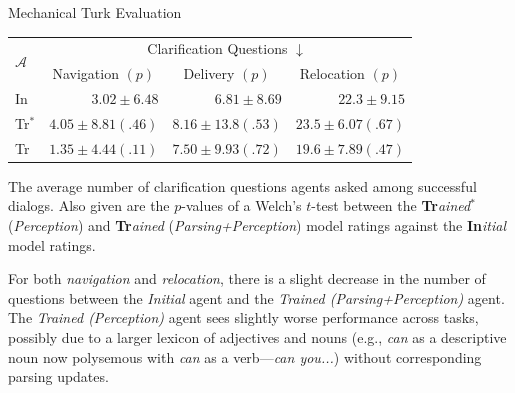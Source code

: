 \documentclass[final]{beamer}
\newcommand{\setblocksize}{\Large \centering}
\newcommand{\paragraphbreak}{\vspace{1cm}}
\begin{document}
\begin{frame}{}
\begin{columns}[t]
\begin{column}{0.24\linewidth}
\begin{block}{\setblocksize Mechanical Turk Evaluation}
{\begin{table}[t]
    \centering
    \begin{tabular}{l r r r}
        \multirow{2}{*}{$\mathcal{A}$} & \multicolumn{3}{c}{Clarification Questions $\downarrow$} \\
        & \multicolumn{1}{c}{Navigation $(p)$} & \multicolumn{1}{c}{Delivery $(p)$} & \multicolumn{1}{c}{Relocation $(p)$} \\
        \toprule
        In & $3.02\pm6.48$\phantom{$(.00)$} & $6.81\pm8.69$\phantom{$(.00)$} & $22.3\pm9.15$\phantom{$(.00)$} \\
        Tr$^*$ & $4.05\pm8.81 (.46)$ & $8.16\pm13.8 (.53)$ & $23.5\pm6.07 (.67)$ \\
        Tr & $1.35\pm4.44 (.11)$ & $7.50\pm9.93 (.72)$ & $19.6\pm7.89 (.47)$ \\
        \bottomrule
    \end{tabular}
\end{table}
The average number of clarification questions agents asked among successful dialogs.
Also given are the $p$-values of a Welch's $t$-test between the \textbf{Tr}\emph{ained}$^*$ (\emph{Perception}) and \textbf{Tr}\emph{ained} (\emph{Parsing+Perception}) model ratings against the \textbf{In}\emph{itial} model ratings.
\paragraphbreak

For both \emph{navigation} and \emph{relocation}, there is a slight decrease in the number of questions between the \emph{Initial} agent and the \emph{Trained (Parsing+Perception)} agent.
The \emph{Trained (Perception)} agent sees slightly worse performance across tasks, possibly due to a larger lexicon of adjectives and nouns (e.g., \emph{can} as a descriptive noun now polysemous with \emph{can} as a verb---\emph{can you...}) without corresponding parsing updates.

}
\end{block}
\end{column}
\end{columns}
\end{frame}
\end{document}
